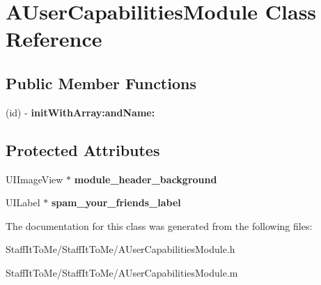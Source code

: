 \hypertarget{interface_a_user_capabilities_module}{
\section{\-A\-User\-Capabilities\-Module \-Class \-Reference}
\label{interface_a_user_capabilities_module}
}
\subsection*{\-Public \-Member \-Functions}
\begin{DoxyCompactItemize}
\item 
\hypertarget{interface_a_user_capabilities_module_aa87a73e8b70e9659a8175a71124da2ee}{
(id) -\/ {\bfseries init\-With\-Array\-:and\-Name\-:}}
\label{interface_a_user_capabilities_module_aa87a73e8b70e9659a8175a71124da2ee}

\end{DoxyCompactItemize}
\subsection*{\-Protected \-Attributes}
\begin{DoxyCompactItemize}
\item 
\hypertarget{interface_a_user_capabilities_module_ad345c287335e04458ad352ccb856cb9e}{
\-U\-I\-Image\-View $\ast$ {\bfseries module\-\_\-header\-\_\-background}}
\label{interface_a_user_capabilities_module_ad345c287335e04458ad352ccb856cb9e}

\item 
\hypertarget{interface_a_user_capabilities_module_a53344d844b5d914d7255f082faeb9626}{
\-U\-I\-Label $\ast$ {\bfseries spam\-\_\-your\-\_\-friends\-\_\-label}}
\label{interface_a_user_capabilities_module_a53344d844b5d914d7255f082faeb9626}

\end{DoxyCompactItemize}


\-The documentation for this class was generated from the following files\-:\begin{DoxyCompactItemize}
\item 
\-Staff\-It\-To\-Me/\-Staff\-It\-To\-Me/\-A\-User\-Capabilities\-Module.\-h\item 
\-Staff\-It\-To\-Me/\-Staff\-It\-To\-Me/\-A\-User\-Capabilities\-Module.\-m\end{DoxyCompactItemize}
